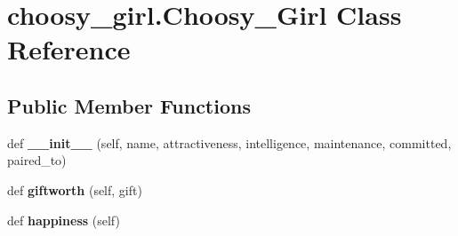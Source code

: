 \hypertarget{classchoosy__girl_1_1_choosy___girl}{}\section{choosy\+\_\+girl.\+Choosy\+\_\+\+Girl Class Reference}
\label{classchoosy__girl_1_1_choosy___girl}
\subsection*{Public Member Functions}
\begin{DoxyCompactItemize}
\item 
\mbox{\label{classchoosy__girl_1_1_choosy___girl_af359f24e40dd32cd42b4e556957c4398}} 
def {\bfseries \+\_\+\+\_\+init\+\_\+\+\_\+} (self, name, attractiveness, intelligence, maintenance, committed, paired\+\_\+to)
\item 
\mbox{\label{classchoosy__girl_1_1_choosy___girl_a0ca3f882f7db874f3d9a8910e1200610}} 
def {\bfseries giftworth} (self, gift)
\item 
\mbox{\label{classchoosy__girl_1_1_choosy___girl_a02611ddf51ba90e2d483ba3895258b5d}} 
def {\bfseries happiness} (self)
\end{DoxyCompactItemize}
